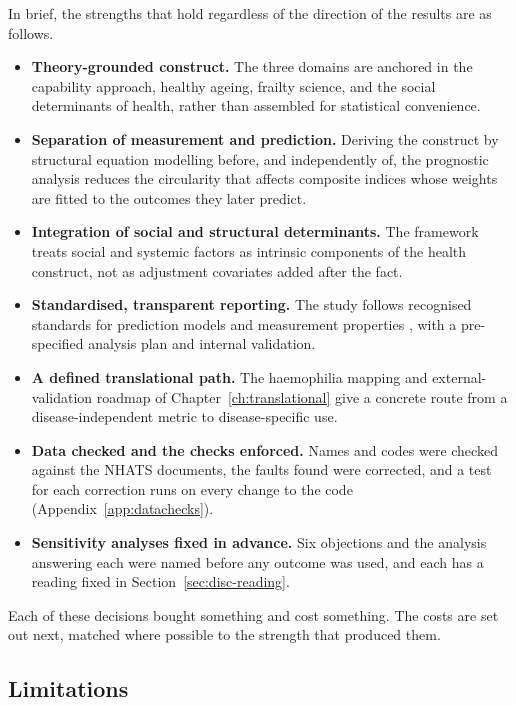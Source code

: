 In brief, the strengths that hold regardless of the direction of the results are as follows.

\begin{itemize}
  \item \textbf{Theory-grounded construct.} The three domains are anchored in the capability approach, healthy ageing, frailty science, and the social determinants of health, rather than assembled for statistical convenience.
  \item \textbf{Separation of measurement and prediction.} Deriving the construct by structural equation modelling before, and independently of, the prognostic analysis reduces the circularity that affects composite indices whose weights are fitted to the outcomes they later predict.
  \item \textbf{Integration of social and structural determinants.} The framework treats social and systemic factors as intrinsic components of the health construct, not as adjustment covariates added after the fact.
  \item \textbf{Standardised, transparent reporting.} The study follows recognised standards for prediction models and measurement properties \citep{collins_2024,moons_2019}, with a pre-specified analysis plan and internal validation.
  \item \textbf{A defined translational path.} The haemophilia mapping and external-validation roadmap of Chapter~\ref{ch:translational} give a concrete route from a disease-independent metric to disease-specific use.
  \item \textbf{Data checked and the checks enforced.} Names and codes were checked against the NHATS documents, the faults found were corrected, and a test for each correction runs on every change to the code (Appendix~\ref{app:datachecks}).
  \item \textbf{Sensitivity analyses fixed in advance.} Six objections and the analysis answering each were named before any outcome was used, and each has a reading fixed in Section~\ref{sec:disc-reading}.
\end{itemize}

Each of these decisions bought something and cost something. The costs are set
out next, matched where possible to the strength that produced them.

\subsection{Limitations}
\label{sec:disc-limitations}

